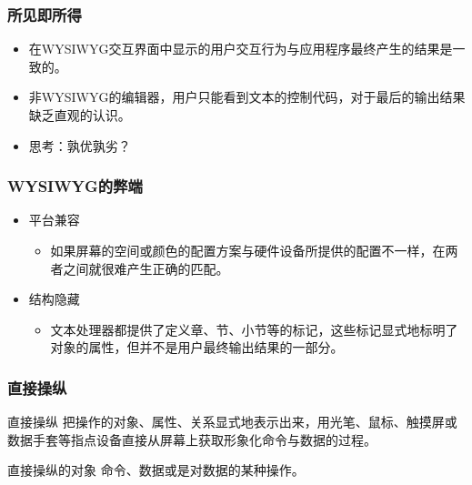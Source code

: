 \documentclass{beamer}
\newcommand{\fullPageImage}[2]{
	{
		\usebackgroundtemplate{\texttt{[image: \#1]}}
		\frame[plain]{#2}
	}
}
\begin{document}
\fullPageImage{images/redcons-fullpreview1-600x356.jpg}{}

\begin{frame}
	\frametitle{所见即所得}
	\beamertemplatetransparentcovereddynamicmedium
	\begin{itemize}[<+->]
		\item 在WYSIWYG交互界面中显示的用户交互行为与应用程序最终产生的结果是一致的。 
		\item 非WYSIWYG的编辑器，用户只能看到文本的控制代码，对于最后的输出结果缺乏直观的认识。
		\item 思考：孰优孰劣？
	\end{itemize}
\end{frame}

\begin{frame}
	\frametitle{WYSIWYG的弊端}
	\beamertemplatetransparentcovereddynamicmedium
	\begin{itemize}[<+->]
		\item 平台兼容
		\begin{itemize}
			\item 如果屏幕的空间或颜色的配置方案与硬件设备所提供的配置不一样，在两者之间就很难产生正确的匹配。
		\end{itemize}
		\item 结构隐藏
		\begin{itemize}
			\item 文本处理器都提供了定义章、节、小节等的标记，这些标记显式地标明了对象的属性，但并不是用户最终输出结果的一部分。
		\end{itemize}
	\end{itemize}
\end{frame}

\fullPageImage{images/texmakertop_big.jpg}{}

\begin{frame}
	\frametitle{直接操纵}
	\beamertemplatetransparentcovereddynamicmedium
	\begin{beamerboxesrounded}[shadow=true]{直接操纵}
	把操作的对象、属性、关系显式地表示出来，用光笔、鼠标、触摸屏或数据手套等指点设备直接从屏幕上获取形象化命令与数据的过程。
	\end{beamerboxesrounded}
	\pause
	\begin{beamerboxesrounded}[shadow=true]{直接操纵的对象}
	命令、数据或是对数据的某种操作。
	\end{beamerboxesrounded}
\end{frame}
\end{document}
